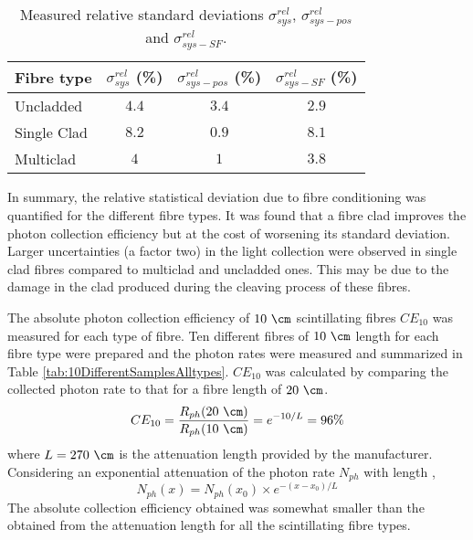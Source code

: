 \begin{table}[htbp]
\centering{}%
\begin{tabular}{lccc}
\toprule 
Fibre type & $\sigma^{rel}_{sys}$ (\%) & $\sigma^{rel}_{sys-pos}$ (\%) & $\sigma^{rel}_{sys-SF}$ (\%) \tabularnewline
\midrule
\midrule 
Uncladded & $4.4$ & $3.4$ & $2.9$ \tabularnewline
Single Clad & $8.2$ & $0.9$ & $8.1$ \tabularnewline
Multiclad & $4$ & $1$ & $3.8$ \tabularnewline
\bottomrule
\end{tabular}
\caption{Measured relative standard deviations $\sigma^{rel}_{sys}$, $\sigma^{rel}_{sys-pos}$ and $\sigma^{rel}_{sys-SF}$.}
\label{tab:RelativeStandardDeviations}
\end{table}

In summary, the relative statistical deviation due to fibre conditioning was quantified for the different fibre types. It was found that a fibre clad improves the photon collection efficiency but at the cost of worsening its standard deviation. Larger uncertainties (a factor two) in the light collection were observed in single clad fibres compared to multiclad and uncladded ones. This may be due to the damage in the clad produced during the cleaving process of these fibres. %

The absolute photon collection efficiency of $10~\cm$ scintillating fibres $CE_{10}$ was measured for each type of fibre. Ten different fibres of $10~\cm$ length for each fibre type were prepared and the photon rates were measured and summarized in Table \ref{tab:10DifferentSamplesAlltypes}. $CE_{10}$ was calculated by comparing the collected photon rate to that for a fibre length of $20~\cm$. 
\begin{equation}
CE_{10}=\frac{R_{ph}(20~\cm)}{R_{ph}(10~\cm)}=e^{-10/L}=96\%
\label{eq:CollectionEfficiency}
\end{equation}
where $L=270~\cm$ is the attenuation length provided by the manufacturer. Considering an exponential attenuation of the photon rate $N_{ph}$ with length \cite{Leo},
\begin{equation}
N_{ph}(x) = N_{ph}(x_0) \times e^{-(x-x_0)/L}
\label{eq:ExponentialAttenuation}
\end{equation}
The absolute collection efficiency obtained was somewhat smaller than the obtained from the attenuation length for all the scintillating fibre types.

